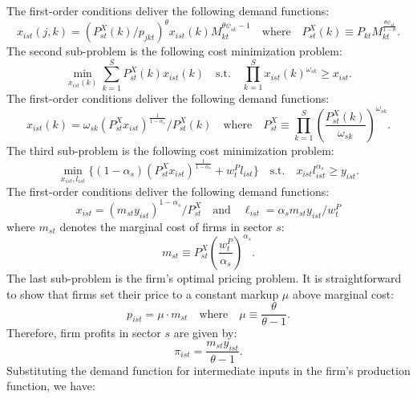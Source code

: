 \documentclass[12pt]{article}
\begin{document}
\clearpage
The first-order conditions deliver the following demand functions:
\begin{equation*}
    x_{ist}(j, k) = (P_{st}^X(k) / p_{jkt})^{\theta} x_{ist}(k) M_{kt}^{\theta \psi_{sk} - 1} \quad \text{where} \quad P_{st}^X(k) \equiv P_{kt} M_{kt}^{\frac{\theta \psi_{sk}}{1 - \theta}}.
\end{equation*}
The second sub-problem is the following cost minimization problem:
\begin{equation*}
    \min_{x_{ist}(k)} \sum_{k = 1}^S P_{st}^X(k) x_{ist}(k) \quad \text{s.t.} \quad \prod_{k = 1}^S x_{ist}(k)^{\omega_{sk}} \geq x_{ist}.
\end{equation*}
The first-order conditions deliver the following demand functions:
\begin{equation*}
    x_{ist}(k) = \omega_{sk} (P_{st}^X x_{ist})^{\frac{1}{1 - \alpha_s}} / P_{st}^X(k) \quad \text{where} \quad P_{st}^X \equiv \prod_{k = 1}^S \left(\frac{P_{st}^X(k)}{\omega_{sk}}\right)^{\omega_{sk}}.
\end{equation*}
The third sub-problem is the following cost minimization problem:
\begin{equation*}
    \min_{x_{ist}, l_{ist}}\{(1 - \alpha_s) (P_{st}^X x_{ist})^{\frac{1}{1 - \alpha_s}} + w_t^P l_{ist}\} \quad \text{s.t.} \quad x_{ist} l_{ist}^{\alpha_s} \geq y_{ist}.
\end{equation*}
The first-order conditions deliver the following demand functions:
\begin{equation*}
    x_{ist} = (m_{st} y_{ist})^{1 - \alpha_s} / P_{st}^X \quad \text{and} \quad \ell_{ist} = \alpha_s m_{st} y_{ist} / w_t^P
\end{equation*}
where $m_{st}$ denotes the marginal cost of firms in sector $s$:
\begin{equation*}
    m_{st} \equiv P_{st}^X \left(\frac{w_t^P}{\alpha_s}\right)^{\alpha_s}.
\end{equation*}
The last sub-problem is the firm's optimal pricing problem. It is straightforward to show that firms set their price to a constant markup $\mu$ above marginal cost:
\begin{equation*}
    p_{ist} = \mu \cdot m_{st} \quad \text{where} \quad \mu \equiv \frac{\theta}{\theta - 1}.
\end{equation*}
Therefore, firm profits in sector $s$ are given by:
\begin{equation*}
    \pi_{ist} = \frac{m_{st} y_{ist}}{\theta - 1}.
\end{equation*}
Substituting the demand function for intermediate inputs in the firm's production function, we have:
\end{document}
